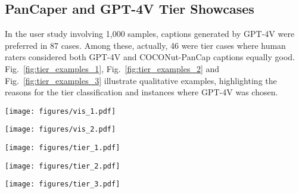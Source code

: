 \subsection{PanCaper and GPT-4V Tier Showcases}
\label{subsec:tier}
In the user study involving 1,000 samples, captions generated by GPT-4V were preferred in 87 cases. Among these, actually, 46 were tier cases where human raters considered both GPT-4V and COCONut-PanCap captions equally good. Fig.~\ref{fig:tier_examples_1}, Fig.~\ref{fig:tier_examples_2} and Fig.~\ref{fig:tier_examples_3} illustrate qualitative examples, highlighting the reasons for the tier classification and instances where GPT-4V was chosen.


\begin{figure*}
    \centering
    \texttt{[image: figures/vis\_1.pdf]}
    \caption{
    \textbf{Visualization of the Panoptic Grounded Caption.}
    Our annotated captions ground the panoptic segmentation masks.
    }
        \vspace{-20pt}

    \label{fig:vis_examples_1}
\end{figure*}


\begin{figure*}
    \centering
    \texttt{[image: figures/vis\_2.pdf]}
    \caption{
    \textbf{Visualization of the Panoptic Grounded Caption.}
    Our annotated captions ground the panoptic segmentation masks.
    }
        \vspace{-25pt}

    \label{fig:vis_examples_2}
\end{figure*}

\begin{figure*}
    \centering
    \texttt{[image: figures/tier\_1.pdf]}
        \vspace{-10pt}

    \caption{
    \textbf{Tier Examples for the User Study.}
    Our COCONut-PanCap annotations are tied with GPT-4V annotations for some simple cases.
    }
    \label{fig:tier_examples_1}
\end{figure*}

\begin{figure*}
    \centering
    \texttt{[image: figures/tier\_2.pdf]}
    \vspace{-10pt}
    \caption{
    \textbf{Tier Examples for the User Study.}
    Our COCONut-PanCap annotations are tied with GPT-4V annotations for some simple cases.
    }
    \label{fig:tier_examples_2}
\end{figure*}

\begin{figure*}
    \centering
    \texttt{[image: figures/tier\_3.pdf]}
        \vspace{-10pt}

    \caption{
    \textbf{Tier Examples for the User Study.}
    Our COCONut-PanCap annotations are tied with GPT-4V annotations for some simple cases.
    }
    \label{fig:tier_examples_3}
\end{figure*}
